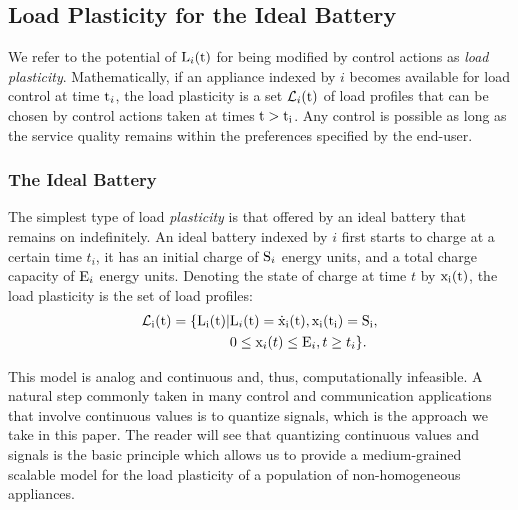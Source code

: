 \documentclass[10pt]{IEEEtran}
\begin{document}
\subsection{Load Plasticity for the Ideal Battery}
We refer to the potential of ${\rm L}_i({\rm t})$ for being modified by control actions as {\it load plasticity}. Mathematically, if an appliance indexed by $i$ becomes available for load control at time ${\rm t}_i$, the load plasticity is a set ${\mathcal L}_i({\rm t})$ of load profiles that can be chosen by control actions taken at times ${\rm t>t_i}$. Any control is possible as long as the service quality remains within the preferences specified by the end-user.

  


\subsubsection{The Ideal Battery} The simplest type of load {\it plasticity} is that offered by an ideal battery that remains on indefinitely. An ideal battery indexed by $i$ first starts  to charge at a certain time $t_i$, it has an initial charge of ${\rm S}_i$ energy units, and a total charge capacity of ${\rm E}_i$ energy units. Denoting the  state of charge at time $t$ by $\rm x_i(t)$, the load plasticity is the set of load profiles:
  \begin{align}\label{lossless-battery}
  \rm
{\mathcal L}_i(\rm t)=\{\rm L_i(\rm t) |&  {\rm L}_i(\rm t) = \dot {\rm x}_i(\rm t), {\rm x}_i(t_i) = {\rm S}_i,\nonumber\\ & 0 \leq {\rm x}_i(t)\leq {\rm E}_i, t\geq t_i \}.
\end{align}


This model is analog and continuous and, thus, computationally infeasible. A natural step commonly taken in many control and communication applications that involve continuous values is to quantize signals, which is the approach we take in this paper. The reader will see that  quantizing continuous values and signals is the basic principle which allows us to provide a medium-grained scalable model for the load plasticity of a population of non-homogeneous appliances.
\end{document}
